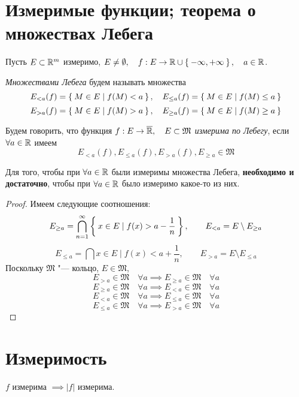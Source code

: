 \section{Измеримые функции; теорема о множествах Лебега}

\begin{definition}
	Пусть $ E \subset \mathbb{R}^m $ измеримо, $ E \ne \emptyset, \quad f : E \to \mathbb{R} \cup \Set{-\infty, +\infty}, \quad a \in \mathbb{R} $.

	\emph{Множествами Лебега} будем называть множества
	$$ E_{<a}(f) = \Set{M \in E \mid f(M) < a}, \quad E_{\le a}(f) = \Set{M \in E \mid f(M) \le a} $$
	$$ E_{>a}(f) = \Set{M \in E \mid f(M) > a}, \quad E_{\ge a}(f) = \Set{M \in E \mid f(M) \ge a} $$
\end{definition}

\begin{definition}
	Будем говорить, что функция $ f : E \to \overline {\mathbb{R}}, \quad E \subset \mathfrak M $ \emph{измерима по Лебегу}, если $ \forall a \in \mathbb{R} $ имеем
	$$ E_{<a}(f), E_{\le a}(f), E_{>a}(f), E_{\ge a} \in \mathfrak M $$
\end{definition}

\begin{theorem}
	Для того, чтобы при $ \forall a \in \mathbb{R} $ были измеримы множества Лебега, \textbf{необходимо и достаточно}, чтобы при $ \forall a \in \mathbb{R} $ было измеримо какое-то из них.
\end{theorem}

\begin{proof}
	Имеем следующие соотношения:
	$$ E_{\ge a} = \bigcap_{n = 1}^\infty \Set{x \in E \mid f(x) > a - \frac1n}, \qquad E_{<a} = E \setminus E_{\ge a} $$
	$$ E_{\le a} = \bigcap {x \in E \mid f(x) < a + \frac1n}, \qquad E_{>a} = E \setminus E_{\le a} $$
	Поскольку $ \mathfrak M $ "--- кольцо, $ E \in \mathfrak M $,
	$$ E_{>a} \in \mathfrak M \quad \forall a \implies E_{\ge a} \in \mathfrak M \quad \forall a $$
	$$ E_{\ge a} \in \mathfrak M \quad \forall a \implies E_{<a} \in \mathfrak M \quad \forall a $$
	$$ E_{<a} \in \mathfrak M \quad \forall a \implies E_{\le a} \in \mathfrak M \quad \forall a $$
	$$ E_{\le a} \in \mathfrak M \quad \forall a \implies E_{>a} \in \mathfrak M \quad \forall a $$
\end{proof}

\section{Измеримость }

\begin{property}
	$ f $ измерима $ \implies |f| $ измерима.
\end{property}

